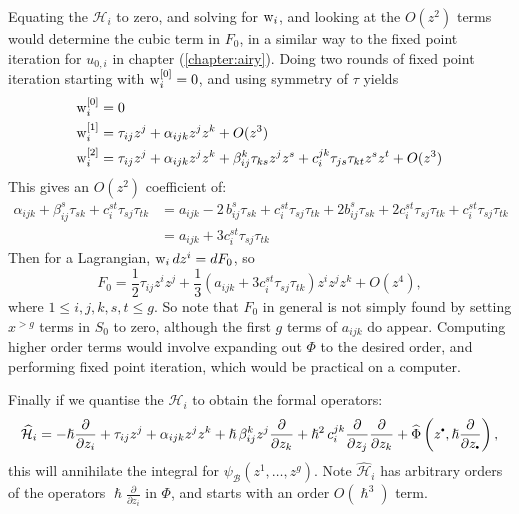     Equating the \( \mathcal{H}_i\) to zero, and solving for \(\mathrm{w}_i\), and looking at the \( O(z^2)\) terms would determine the cubic term in \(F_0\), in a similar way to the fixed point iteration for \(u_{0,i}\) in chapter (\ref{chapter:airy}). Doing two rounds of fixed point iteration starting with \(\mathrm{w}_i^{[0]} = 0 \), and using symmetry of \( \tau\) yields
    \begin{align*}
        \mathrm{w}_i^{[0]} &= 0\\
        \mathrm{w}_i^{[1]} &= \tau_{ij} z^j + \alpha_{ijk} z^j z^k  + O(z^3)\\
        \mathrm{w}_i^{[2]} &= \tau_{ij} z^j + \alpha_{ijk}z^j z^k +  \beta_{ij}^k  \tau_{ks} z^j z^s  + c_{i}^{jk}  \tau_{js} \tau_{k t} z^s z^t + O(z^3)
    \end{align*}
    This gives an \( O(z^2)\) coefficient of:
    \begin{align*} \alpha_{ijk} + \beta_{ij}^{s} \tau_{s k} + c_{i}^{st} \tau_{s j} \tau_{t k} &=  a_{ijk} - 2 \, b_{ij}^s \tau_{sk} + c_i^{st} \tau_{sj}\tau_{tk} + 2 b_{ij}^s \tau_{sk} + 2 c_{i}^{st} \tau_{sj} \tau_{tk} + c_{i}^{st} \tau_{s j} \tau_{t k} \\
    & = a_{ijk} + 3 c_i^{st}\tau_{sj} \tau_{tk}
    \end{align*}
    Then for a Lagrangian, \(\mathrm{w}_i \,dz^i =  d F_0\), so
    \[ F_0 = \frac{1}{2} \tau_{ij} z^i z^j + \frac{1}{3} \left( a_{ijk} + 3 c_i^{st}\tau_{sj} \tau_{tk} \right) z^i z^j z^k  + O(z^4),  \]
    where \( 1 \leq i,j,k,s,t \leq g\). So note that \(F_0\) in general is not simply found by setting \(x^{>g}\) terms in \(S_0\) to zero, although the first \(g\) terms of \(a_{ijk}\) do appear. Computing higher order terms would involve expanding out \( \Phi\) to the desired order, and performing fixed point iteration, which would be practical on a computer.
    
    Finally if we quantise the \( \mathcal{H}_i\) to obtain the formal operators:
    \[ \widehat{\mathcal{H}}_i =   - \hslash \frac{\partial}{\partial z_i } + \tau_{ij} z^j +  \alpha_{ijk} z^j z^k + \hslash \, \beta_{ij}^k z^j  \frac{\partial}{\partial z_k } + \hslash^2 \, c_{i}^{jk} \frac{\partial}{\partial z_j } \frac{\partial}{\partial z_k } + \widehat{\Phi} \left( z^{\sbt} ,\hslash \frac{\partial}{\partial z_{\sbt} } \right),\] 
    this will annihilate the integral for \( \psi_{\mathcal{B}}(z^1, \dots, z^g) \). Note \(\widehat{\mathcal{H}}_i \) has arbitrary orders of the operators \(\hslash  \frac{\partial}{\partial z_i}\) in  \( \Phi \), and starts with an order \( O(\hslash^3)\) term.